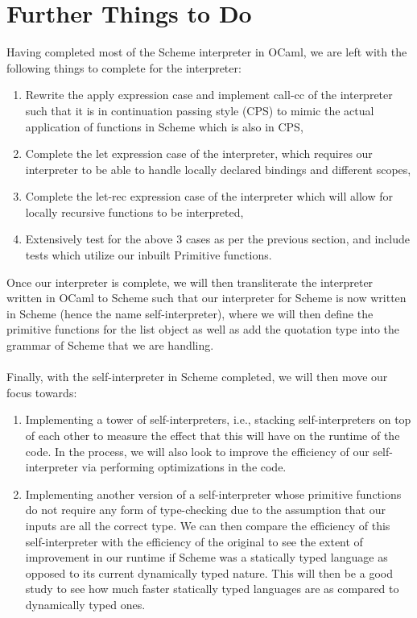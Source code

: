 \section{Further Things to Do}
Having completed most of the Scheme interpreter in OCaml, we are left with the following things to complete for the interpreter:
\begin{enumerate}
   \item Rewrite the apply expression case and implement call-cc of the interpreter such that it is in continuation passing style (CPS) to mimic the actual application of functions in Scheme which is also in CPS,
   \item Complete the let expression case of the interpreter, which requires our interpreter to be able to handle locally declared bindings and different scopes,
   \item Complete the let-rec expression case of the interpreter which will allow for locally recursive functions to be interpreted,
   \item Extensively test for the above 3 cases as per the previous section, and include tests which utilize our inbuilt Primitive functions.
\end{enumerate}
Once our interpreter is complete, we will then transliterate the interpreter written in OCaml to Scheme such that our interpreter for Scheme is now written in Scheme (hence the name self-interpreter), where we 
will then define the primitive functions for the list object as well as add the quotation type into the grammar of Scheme that we are handling.
\\
\\
Finally, with the self-interpreter in Scheme completed, we will then move our focus towards:
\begin{enumerate}
   \item Implementing a tower of self-interpreters, i.e., stacking self-interpreters on top of each other to measure the effect that this will have on the runtime of the code. In the process, we will also look to 
   improve the efficiency of our self-interpreter via performing optimizations in the code.
   \item Implementing another version of a self-interpreter whose primitive functions do not require any form of type-checking due to the assumption that our inputs are all the correct type. We can then compare the efficiency of 
   this self-interpreter with the efficiency of the original to see the extent of improvement in our runtime if Scheme was a statically typed language as opposed to its current dynamically typed nature. This will then be a 
   good study to see how much faster statically typed languages are as compared to dynamically typed ones.
\end{enumerate}
